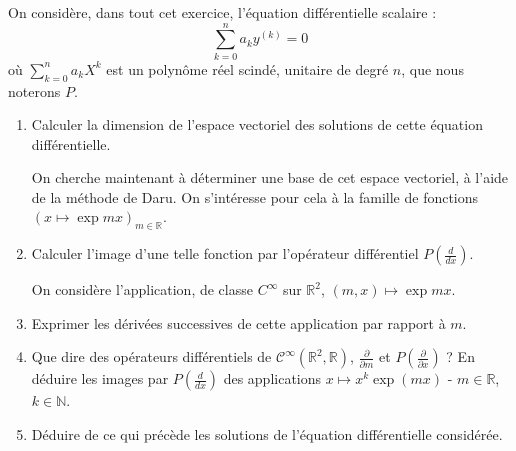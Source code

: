 \begin{exer}%
On considère, dans tout cet exercice, l'équation différentielle scalaire : \[\sum\limits_{k=0}^n a_k y^{(k)} = 0\]
où $\sum\limits_{k=0}^n a_k X^k$ est un polynôme réel scindé, unitaire de degré $n$, que nous noterons $P$.
\begin{enumerate}
\item Calculer la dimension de l'espace vectoriel des solutions de cette équation différentielle.

\smallskip
On cherche maintenant à déterminer une base de cet espace vectoriel, à l'aide de la méthode de Daru. On s'int\'eresse pour cela à la famille de fonctions $(x \mapsto \exp mx)_{m \in \mathbb{R}}$.
\item Calculer l'image d'une telle fonction par l'opérateur différentiel $P(\frac{d}{dx})$.

\smallskip
On consid\`ere l'application, de classe $C^{\infty}$ sur $\mathbb{R}^2$, $(m,x) \mapsto \exp mx$.
\item Exprimer les d\'eriv\'ees successives de cette application par rapport à $m$.\\
\item Que dire des opérateurs différentiels de $\mathcal{C}^{\infty}(\mathbb{R}^2,\mathbb{R})$, $\frac{\partial}{\partial m}$ et $P(\frac{\partial}{\partial x})$ ? En déduire les images par $P(\frac{d}{dx})$ des applications $x \mapsto x^k \exp(mx)$ - $m \in \mathbb{R}$, $k \in \mathbb{N}$.
\item D\'eduire de ce qui pr\'ec\`ede les solutions de l'\'equation diff\'erentielle consid\'er\'ee.
\end{enumerate}
\end{exer}